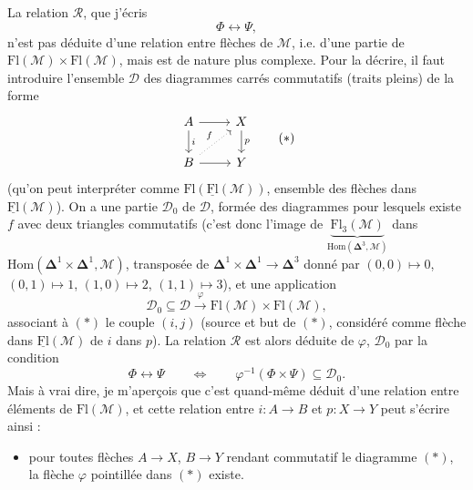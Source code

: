 \documentclass[11pt]{article}
\newcommand{\printedpage}[1]{\marginpar{\footnotesize p.~#1}}
\def\dcprintedpending{}
\newcommand{\msp}[1]{\marginpar{\footnotesize\raggedright
  \ifx\dcprintedpending\empty\else p.~\dcprintedpending\par\fi
  [#1]}\gdef\dcprintedpending{}}
\newcommand{\Fl}{\mathrm{Fl}}
\begin{document}
\begin{itemize}[leftmargin=2.5em]
La relation $\mathcal{R}$, que j'écris
\[
\Phi\longleftrightarrow\Psi,
\]
\msp{page 81}n'est pas déduite d'une relation entre flèches de $\mathcal{M}$, i.e. d'une partie de $\Fl(\mathcal{M})\times\Fl(\mathcal{M})$, mais est de nature plus complexe. Pour la décrire, il faut introduire l'ensemble $\mathcal{D}$ des diagrammes carrés commutatifs (traits pleins) de la forme
\[
\begin{tikzcd}
A \arrow[r] \arrow[d, "i"] & X \arrow[d, "p"] \\
B \arrow[r] \arrow[ur, dotted, "f"] & Y
\end{tikzcd}
\tag*{$(*)$}
\]
\printedpage{50}
(qu'on peut interpréter comme $\Fl(\underline{\Fl}(\mathcal{M}))$, ensemble des flèches dans $\underline{\Fl}(\mathcal{M})$). On a une partie $\mathcal{D}_0$ de $\mathcal{D}$, formée des diagrammes pour lesquels existe $f$ avec deux triangles commutatifs (c'est donc l'image de $\underbrace{\Fl_3(\mathcal{M})}_{\mathrm{Hom}(\boldsymbol{\Delta}^3,\mathcal{M})}$ dans $\mathrm{Hom}(\boldsymbol{\Delta}^1\times\boldsymbol{\Delta}^1,\mathcal{M})$, transposée de $\boldsymbol{\Delta}^1\times\boldsymbol{\Delta}^1\longrightarrow\boldsymbol{\Delta}^3$ donné par $(0,0)\longmapsto 0$, $(0,1)\longmapsto 1$, $(1,0)\longmapsto 2$, $(1,1)\longmapsto 3$), et une application
\[
\mathcal{D}_0\subseteq\mathcal{D}\xrightarrow{\ \varphi\ }\Fl(\mathcal{M})\times\Fl(\mathcal{M}),
\]
associant à $(*)$ le couple $(i,j)$ (source et but de $(*)$, considéré comme flèche dans $\underline{\Fl}(\mathcal{M})$ de $i$ dans $p$). La relation $\mathcal{R}$ est alors déduite de $\varphi$, $\mathcal{D}_0$ par la condition
\msp{page 82}
\[
\Phi\longleftrightarrow\Psi\qquad\Longleftrightarrow\qquad\varphi^{-1}(\Phi\times\Psi)\subseteq\mathcal{D}_0.
\]
Mais à vrai dire, je m'aperçois que c'est quand-même déduit d'une relation entre éléments de $\Fl(\mathcal{M})$, et cette relation entre $i : A\longrightarrow B$ et $p : X\longrightarrow Y$ peut s'écrire ainsi :
\begin{itemize}[leftmargin=3em]
\item[$(**)$] pour toutes flèches $A\longrightarrow X$, $B\longrightarrow Y$ rendant commutatif le diagramme $(*)$, la flèche $\varphi$ pointillée dans $(*)$ existe. %
\end{itemize}
\end{itemize}
\end{document}
